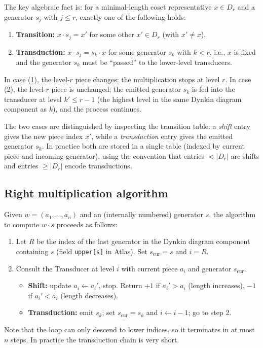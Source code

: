 \documentclass[12pt]{amsart}
\begin{document}
The key algebraic fact is: for a minimal-length coset representative
$x \in D_r$ and a generator $s_j$ with $j \leq r$, exactly one of the
following holds:
\begin{enumerate}
  \item \textbf{Transition:} $x \cdot s_j = x'$ for some other $x' \in D_r$
    (with $x' \neq x$).
  \item \textbf{Transduction:} $x \cdot s_j = s_k \cdot x$ for some generator
    $s_k$ with $k < r$, i.e., $x$ is fixed and the generator $s_k$ must be
    ``passed'' to the lower-level transducers.
\end{enumerate}
In case (1), the level-$r$ piece changes; the multiplication stops at level $r$.
In case (2), the level-$r$ piece is unchanged; the emitted generator $s_k$ is
fed into the transducer at level $k' \leq r-1$ (the highest level in the same
Dynkin diagram component as $k$), and the process continues.

The two cases are distinguished by inspecting the transition table: a
\emph{shift} entry gives the new piece index $x'$, while a
\emph{transduction} entry gives the emitted generator $s_k$.  In practice
both are stored in a single table (indexed by current piece and incoming
generator), using the convention that entries $< |D_r|$ are shifts and entries
$\geq |D_r|$ encode transductions.

\subsection{Right multiplication algorithm}

Given $w = (a_1, \ldots, a_n)$ and an (internally numbered) generator $s$,
the algorithm to compute $w \cdot s$ proceeds as follows:
\begin{enumerate}
  \item Let $R$ be the index of the last generator in the Dynkin diagram
    component containing $s$ (field \texttt{upper[s]} in Atlas).  Set
    $s_{\mathrm{cur}} = s$ and $i = R$.
  \item Consult the Transducer at level $i$ with current piece $a_i$ and
    generator $s_{\mathrm{cur}}$.
  \begin{itemize}
    \item \textbf{Shift:} update $a_i \leftarrow a_i'$, stop.  Return $+1$ if
      $a_i' > a_i$ (length increases), $-1$ if $a_i' < a_i$ (length decreases).
    \item \textbf{Transduction:} emit $s_k$; set $s_{\mathrm{cur}} = s_k$
      and $i \leftarrow i - 1$; go to step 2.
  \end{itemize}
\end{enumerate}
Note that the loop can only descend to lower indices, so it terminates in at
most $n$ steps.  In practice the transduction chain is very short.
\end{document}
